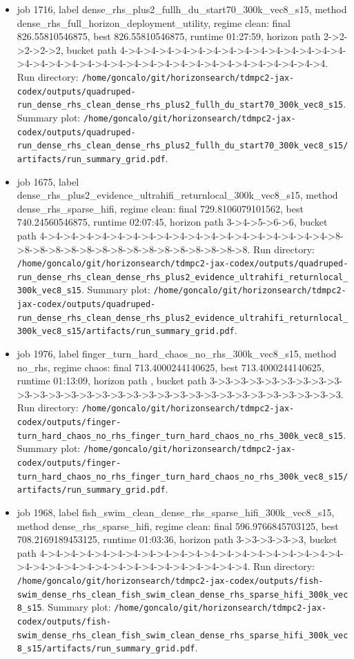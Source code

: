 \begin{itemize}
\item job 1716, label dense\_rhs\_plus2\_fullh\_du\_start70\_300k\_vec8\_s15, method dense\_rhs\_full\_horizon\_deployment\_utility, regime clean: final 826.55810546875, best 826.55810546875, runtime 01:27:59, horizon path 2->2->2->2->2, bucket path 4->4->4->4->4->4->4->4->4->4->4->4->4->4->4->4->4->4->4->4->4->4->4->4->4->4->4->4->4->4->4->4->4->4->4. Run directory: \texttt{/home/goncalo/git/horizonsearch/tdmpc2-jax-codex/outputs/quadruped-run\_dense\_rhs\_clean\_dense\_rhs\_plus2\_fullh\_du\_start70\_300k\_vec8\_s15}. Summary plot: \texttt{/home/goncalo/git/horizonsearch/tdmpc2-jax-codex/outputs/quadruped-run\_dense\_rhs\_clean\_dense\_rhs\_plus2\_fullh\_du\_start70\_300k\_vec8\_s15/artifacts/run\_summary\_grid.pdf}.
\item job 1675, label dense\_rhs\_plus2\_evidence\_ultrahifi\_returnlocal\_300k\_vec8\_s15, method dense\_rhs\_sparse\_hifi, regime clean: final 729.8106079101562, best 740.24560546875, runtime 02:07:45, horizon path 3->4->5->6->6, bucket path 4->4->4->4->4->4->4->4->4->4->4->4->4->4->4->4->4->4->4->8->8->8->8->8->8->8->8->8->8->8->8->8->8->8->8. Run directory: \texttt{/home/goncalo/git/horizonsearch/tdmpc2-jax-codex/outputs/quadruped-run\_dense\_rhs\_clean\_dense\_rhs\_plus2\_evidence\_ultrahifi\_returnlocal\_300k\_vec8\_s15}. Summary plot: \texttt{/home/goncalo/git/horizonsearch/tdmpc2-jax-codex/outputs/quadruped-run\_dense\_rhs\_clean\_dense\_rhs\_plus2\_evidence\_ultrahifi\_returnlocal\_300k\_vec8\_s15/artifacts/run\_summary\_grid.pdf}.
\item job 1976, label finger\_turn\_hard\_chaos\_no\_rhs\_300k\_vec8\_s15, method no\_rhs, regime chaos: final 713.4000244140625, best 713.4000244140625, runtime 01:13:09, horizon path , bucket path 3->3->3->3->3->3->3->3->3->3->3->3->3->3->3->3->3->3->3->3->3->3->3->3->3->3->3->3->3->3. Run directory: \texttt{/home/goncalo/git/horizonsearch/tdmpc2-jax-codex/outputs/finger-turn\_hard\_chaos\_no\_rhs\_finger\_turn\_hard\_chaos\_no\_rhs\_300k\_vec8\_s15}. Summary plot: \texttt{/home/goncalo/git/horizonsearch/tdmpc2-jax-codex/outputs/finger-turn\_hard\_chaos\_no\_rhs\_finger\_turn\_hard\_chaos\_no\_rhs\_300k\_vec8\_s15/artifacts/run\_summary\_grid.pdf}.
\item job 1968, label fish\_swim\_clean\_dense\_rhs\_sparse\_hifi\_300k\_vec8\_s15, method dense\_rhs\_sparse\_hifi, regime clean: final 596.9766845703125, best 708.2169189453125, runtime 01:03:36, horizon path 3->3->3->3->3, bucket path 4->4->4->4->4->4->4->4->4->4->4->4->4->4->4->4->4->4->4->4->4->4->4->4->4->4->4->4->4->4->4->4->4->4->4. Run directory: \texttt{/home/goncalo/git/horizonsearch/tdmpc2-jax-codex/outputs/fish-swim\_dense\_rhs\_clean\_fish\_swim\_clean\_dense\_rhs\_sparse\_hifi\_300k\_vec8\_s15}. Summary plot: \texttt{/home/goncalo/git/horizonsearch/tdmpc2-jax-codex/outputs/fish-swim\_dense\_rhs\_clean\_fish\_swim\_clean\_dense\_rhs\_sparse\_hifi\_300k\_vec8\_s15/artifacts/run\_summary\_grid.pdf}.

\end{itemize}
